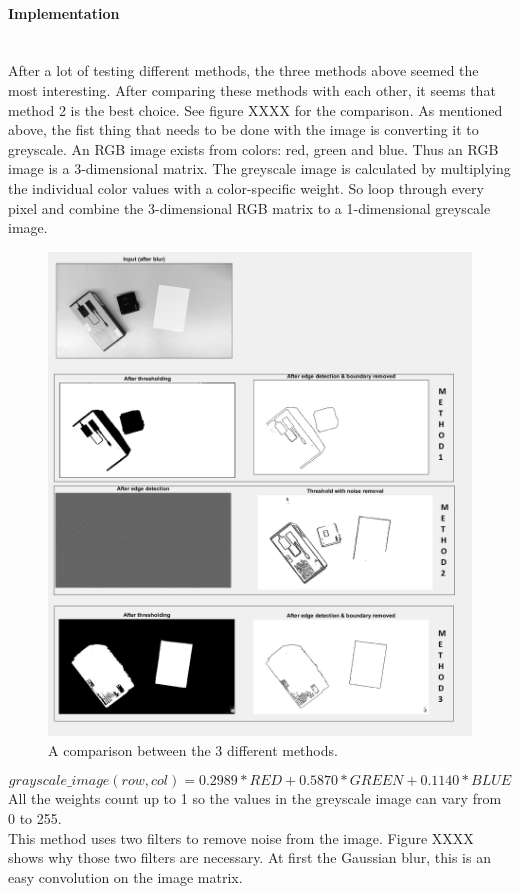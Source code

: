\documentclass[11pt]{article}
\begin{document}
\paragraph{Implementation}\mbox{}\\
After a lot of testing different methods, the three methods above seemed the most interesting. After comparing these methods with each other, it seems that method 2 is the best choice. See figure XXXX for the comparison. As mentioned above, the fist thing that needs to be done with the image is converting it to greyscale. An RGB image exists from colors: red, green and blue. Thus an RGB image is a 3-dimensional matrix. The greyscale image is calculated by multiplying the individual color values with a color-specific weight. So loop through every pixel and combine the 3-dimensional RGB matrix to a 1-dimensional greyscale image.
\begin{figure}[h]
	\center
  \includegraphics[width=0.7\linewidth]{comparison_methods.png}
  \caption{A comparison between the 3 different methods.}
  \label{fig:comparison_methods}
\end{figure}
\begin{equation}
grayscale\_image(row, col) = 0.2989 * RED + 0.5870 * GREEN + 0.1140 * BLUE
\end{equation}
All the weights count up to 1 so the values in the greyscale image can vary from 0 to 255.
\\This method uses two filters to remove noise from the image. Figure XXXX shows why those two filters are necessary.
At first the Gaussian blur, this is an easy convolution on the image matrix.
\end{document}
